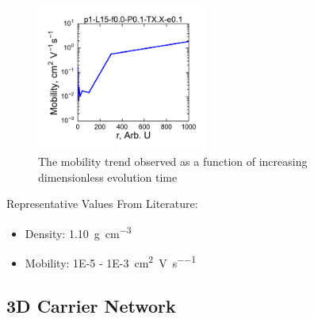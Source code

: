 \documentclass[12pt]{article}
\def\mobunits{\square\centi\meter\per\volt\per\second}
\def\gcm{\gram\per\cubic\centi\meter}
\begin{document}
\begin{figure}[h!]\centering
	\includegraphics[width=0.5\textwidth]{Figures/HoleMob.pdf}
    \caption{The mobility trend observed as a function of increasing dimensionless evolution time}
	\label{fig:MSD}
\end{figure}

Representative Values From Literature:
\begin{itemize}
    \item{Density: \SI{1.10}{\gcm}\cite{Newbloom2012a}}
\item{Mobility: \SI{1E-5}{} - \SI{1E-3}{\mobunits}\cite{Ballantyne2008b,Mauer2010,Pandey2000,Kim2006}}
\end{itemize}

\clearpage

\subsection{3D Carrier Network}
\end{document}
